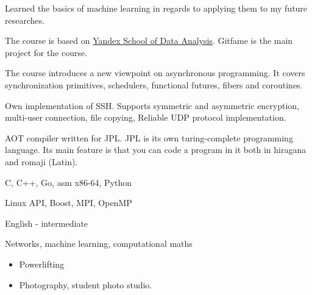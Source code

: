 
Learned the basics of machine learning in regards to applying them to my future researches.
\medskip

The course is based on \href{https://shad.yandex.ru}{Yandex School of Data Analysis}. Gitfame is the main project for the course.
\medskip

The course introduces a new viewpoint on asynchronous programming.
It covers synchronization primitives, schedulers, functional futures, fibers and coroutines.
\medskip

Own implementation of SSH. Supports symmetric and asymmetric encryption, multi-user connection, file copying, Reliable UDP protocol implementation.
\medskip

AOT compiler written for JPL. JPL is its own turing-complete programming language.
Its main feature is that you can code a program in it both in hiragana and romaji (Latin).

\divider

C, C++, Go, asm x86-64, Python
\medskip

Linux API, Boost, MPI, OpenMP
\medskip

English - intermediate
\medskip

Networks, machine learning, computational maths

\divider

\begin{itemize}
    \item Powerlifting
    \item Photography, student photo studio.
\end{itemize}

\divider


